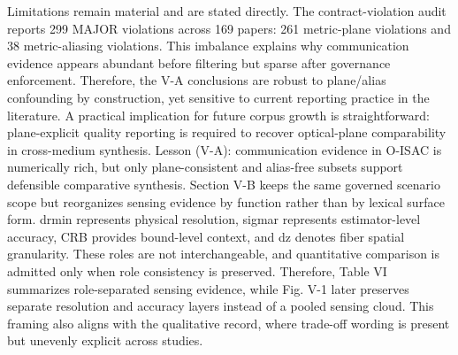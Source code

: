 {}Limitations remain material and are stated directly. The contract-violation audit reports 299 MAJOR violations across 169 papers: 261 metric-plane violations and 38 metric-aliasing violations. This imbalance explains why communication evidence appears abundant before filtering but sparse after governance enforcement. Therefore, the V-A conclusions are robust to plane/alias confounding by construction, yet sensitive to current reporting practice in the literature. A practical implication for future corpus growth is straightforward: plane-explicit quality reporting is required to recover optical-plane comparability in cross-medium synthesis.\markdownRendererParagraphSeparator
{}Lesson (V-A): communication evidence in O-ISAC is numerically rich, but only plane-consistent and alias-free subsets support defensible comparative synthesis.\markdownRendererInterblockSeparator
{}
\markdownRendererSectionEnd \markdownRendererSectionBegin
{}\markdownRendererInterblockSeparator
{}Section V-B keeps the same governed scenario scope but reorganizes sensing evidence by function rather than by lexical surface form. drmin represents physical resolution, sigma\markdownRendererUnderscore{}r represents estimator-level accuracy, CRB provides bound-level context, and dz denotes fiber spatial granularity. These roles are not interchangeable, and quantitative comparison is admitted only when role consistency is preserved. Therefore, Table VI summarizes role-separated sensing evidence, while Fig. V-1 later preserves separate resolution and accuracy layers instead of a pooled sensing cloud. This framing also aligns with the qualitative record, where trade-off wording is present but unevenly explicit across studies.\markdownRendererParagraphSeparator
{}\markdownRendererInterblockSeparator
{}\markdownRendererInterblockSeparator
